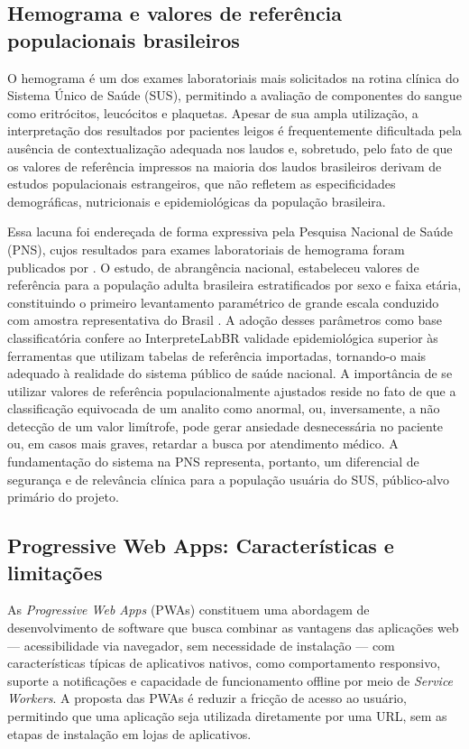 \documentclass[12pt]{article}
\begin{document}
\subsection{Hemograma e valores de referência populacionais brasileiros}

O hemograma é um dos exames laboratoriais mais solicitados na rotina clínica do Sistema Único de Saúde (SUS), permitindo a avaliação de componentes do sangue como eritrócitos, leucócitos e plaquetas. Apesar de sua ampla utilização, a interpretação dos resultados por pacientes leigos é frequentemente dificultada pela ausência de contextualização adequada nos laudos e, sobretudo, pelo fato de que os valores de referência impressos na maioria dos laudos brasileiros derivam de estudos populacionais estrangeiros, que não refletem as especificidades demográficas, nutricionais e epidemiológicas da população brasileira.

Essa lacuna foi endereçada de forma expressiva pela Pesquisa Nacional de Saúde (PNS), cujos resultados para exames laboratoriais de hemograma foram publicados por \cite{rosenfeld2019}. O estudo, de abrangência nacional, estabeleceu valores de referência para a população adulta brasileira estratificados por sexo e faixa etária, constituindo o primeiro levantamento paramétrico de grande escala conduzido com amostra representativa do Brasil \cite{rosenfeld2019}. A adoção desses parâmetros como base classificatória confere ao InterpreteLabBR validade epidemiológica superior às ferramentas que utilizam tabelas de referência importadas, tornando-o mais adequado à realidade do sistema público de saúde nacional. A importância de se utilizar valores de referência populacionalmente ajustados reside no fato de que a classificação equivocada de um analito como anormal, ou, inversamente, a não detecção de um valor limítrofe, pode gerar ansiedade desnecessária no paciente ou, em casos mais graves, retardar a busca por atendimento médico. A fundamentação do sistema na PNS representa, portanto, um diferencial de segurança e de relevância clínica para a população usuária do SUS, público-alvo primário do projeto.

\subsection{Progressive Web Apps: Características e limitações}

As \emph{Progressive Web Apps} (PWAs) constituem uma abordagem de desenvolvimento de software que busca combinar as vantagens das aplicações web --- acessibilidade via navegador, sem necessidade de instalação --- com características típicas de aplicativos nativos, como comportamento responsivo, suporte a notificações e capacidade de funcionamento offline por meio de \emph{Service Workers}. A proposta das PWAs é reduzir a fricção de acesso ao usuário, permitindo que uma aplicação seja utilizada diretamente por uma URL, sem as etapas de instalação em lojas de aplicativos.
\end{document}
